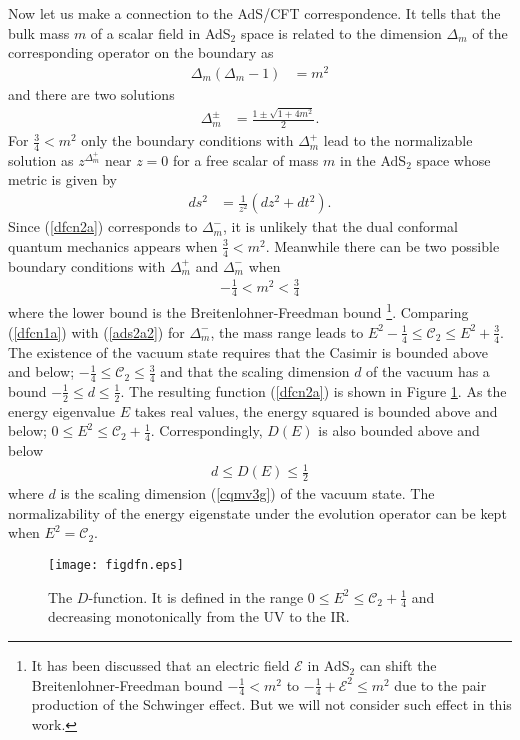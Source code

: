\documentclass[12pt]{article}
\numberwithin{equation}{section}
\begin{document}
Now let us make a connection to the AdS/CFT correspondence. 
It tells \cite{Gubser:1998bc,Witten:1998qj} that the bulk mass $m$ of a scalar field in AdS$_{2}$ space  
is related to the dimension $\Delta_{m}$ of the corresponding operator 
on the boundary as
\begin{align}
\label{ads2a1}
\Delta_{m}(\Delta_{m}-1)&=m^{2}
\end{align}
and there are two solutions 
\begin{align}
\label{ads2a2}
\Delta_{m}^{\pm}&=\frac{1\pm \sqrt{1+4m^{2}}}{2}.
\end{align}
%
For $\frac34<m^{2}$ 
only the boundary conditions with $\Delta_{m}^{+}$ lead to the normalizable solution 
\cite{Breitenlohner:1982bm, Breitenlohner:1982jf, Mezincescu:1984ev}
as $z^{\Delta_{m}^{+}}$ near $z=0$ for a free scalar of mass $m$ 
in the AdS$_{2}$ space whose metric is given by
\begin{align}
\label{ads2}
ds^{2}&=\frac{1}{z^{2}}(dz^{2}+dt^{2}). 
\end{align}
Since (\ref{dfcn2a}) corresponds to $\Delta_{m}^{-}$, 
it is unlikely that the dual conformal quantum mechanics appears when $\frac34<m^{2}$. 
Meanwhile there can be two possible boundary conditions 
with $\Delta_{m}^{+}$ and $\Delta_{m}^{-}$ 
when \cite{Breitenlohner:1982bm, Breitenlohner:1982jf, Mezincescu:1984ev} 
\begin{align}
\label{bfwindow1}
-\frac14<m^{2}<\frac34
\end{align}
where the lower bound is the Breitenlohner-Freedman bound 
\footnote
{It has been discussed \cite{Pioline:2005pf} that 
an electric field $\mathcal{E}$ in AdS$_{2}$ can shift 
the Breitenlohner-Freedman bound 
$-\frac14<m^{2}$ to $-\frac14+\mathcal{E}^{2}\le m^{2}$ 
due to the pair production of the Schwinger effect. 
But we will not consider such effect in this work.}. 
Comparing (\ref{dfcn1a}) with (\ref{ads2a2}) for $\Delta_{m}^{-}$, 
the mass range leads to 
$E^{2}-\frac14\le \mathcal{C}_{2}\le E^{2}+\frac34$. 
The existence of the vacuum state requires that the Casimir 
is bounded above and below; 
$-\frac14\le \mathcal{C}_{2}\le \frac34$ 
and that the scaling dimension $d$ of the vacuum has a bound 
$-\frac12\le d\le \frac12$. 
The resulting function (\ref{dfcn2a}) is shown in Figure \ref{figdfn}. 
As the energy eigenvalue $E$ takes real values, 
the energy squared is bounded above and below; 
$0\le E^{2}\le \mathcal{C}_{2}+\frac14$. 
Correspondingly, $D(E)$ is also bounded above and below
\begin{align}
\label{dfcn2b}
d\le D(E)\le \frac12
\end{align}
where $d$ is the scaling dimension (\ref{cqmv3g}) of the vacuum state. 
The normalizability of the energy eigenstate under the evolution operator can be kept 
when $E^{2}=\mathcal{C}_{2}$. 
%
%
\begin{figure}
\begin{center}
\texttt{[image: figdfn.eps]}
\caption{The $D$-function. 
It is defined in the range $0\le E^{2}\le \mathcal{C}_{2}+\frac14$ and 
decreasing monotonically from the UV to the IR. }
\label{figdfn}
\end{center}
\end{figure}
%
\end{document}
